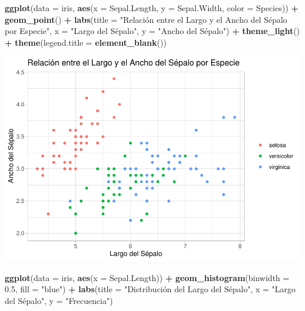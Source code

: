 \documentclass[
]{book}
\newenvironment{Shaded}{\begin{snugshade}}{\end{snugshade}}
\newcommand{\AttributeTok}[1]{\textcolor[rgb]{0.13,0.29,0.53}{#1}}
\newcommand{\FloatTok}[1]{\textcolor[rgb]{0.00,0.00,0.81}{#1}}
\newcommand{\FunctionTok}[1]{\textcolor[rgb]{0.13,0.29,0.53}{\textbf{#1}}}
\newcommand{\NormalTok}[1]{#1}
\newcommand{\SpecialCharTok}[1]{\textcolor[rgb]{0.81,0.36,0.00}{\textbf{#1}}}
\newcommand{\StringTok}[1]{\textcolor[rgb]{0.31,0.60,0.02}{#1}}
\begin{document}
\begin{Shaded}
\begin{Highlighting}[]
\FunctionTok{ggplot}\NormalTok{(}\AttributeTok{data =}\NormalTok{ iris, }\FunctionTok{aes}\NormalTok{(}\AttributeTok{x =}\NormalTok{ Sepal.Length, }\AttributeTok{y =}\NormalTok{ Sepal.Width, }\AttributeTok{color =}\NormalTok{ Species)) }\SpecialCharTok{+} 
  \FunctionTok{geom\_point}\NormalTok{() }\SpecialCharTok{+}
  \FunctionTok{labs}\NormalTok{(}\AttributeTok{title =} \StringTok{"Relación entre el Largo y el Ancho del Sépalo por Especie"}\NormalTok{,}
       \AttributeTok{x =} \StringTok{"Largo del Sépalo"}\NormalTok{,}
       \AttributeTok{y =} \StringTok{"Ancho del Sépalo"}\NormalTok{) }\SpecialCharTok{+}
  \FunctionTok{theme\_light}\NormalTok{() }\SpecialCharTok{+}
  \FunctionTok{theme}\NormalTok{(}\AttributeTok{legend.title =} \FunctionTok{element\_blank}\NormalTok{())}
\end{Highlighting}
\end{Shaded}

\includegraphics{bookdown-demo_files/figure-latex/unnamed-chunk-179-1.pdf}

\begin{Shaded}
\begin{Highlighting}[]
\FunctionTok{ggplot}\NormalTok{(}\AttributeTok{data =}\NormalTok{ iris, }\FunctionTok{aes}\NormalTok{(}\AttributeTok{x =}\NormalTok{ Sepal.Length)) }\SpecialCharTok{+} 
  \FunctionTok{geom\_histogram}\NormalTok{(}\AttributeTok{binwidth =} \FloatTok{0.5}\NormalTok{, }\AttributeTok{fill =} \StringTok{"blue"}\NormalTok{) }\SpecialCharTok{+}
  \FunctionTok{labs}\NormalTok{(}\AttributeTok{title =} \StringTok{"Distribución del Largo del Sépalo"}\NormalTok{,}
       \AttributeTok{x =} \StringTok{"Largo del Sépalo"}\NormalTok{,}
       \AttributeTok{y =} \StringTok{"Frecuencia"}\NormalTok{)}
\end{Highlighting}
\end{Shaded}
\end{document}
